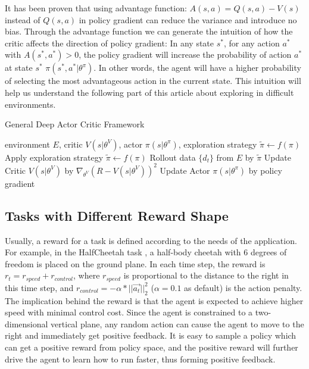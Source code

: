 It has been proven that using advantage function: $A(s,a)=Q(s,a)-V(s)$ instead of $Q(s,a)$ in policy gradient can reduce the variance and introduce no bias. Through the advantage function we can generate the intuition of how the critic affects the direction of policy gradient: In any state $s^*$, for any action $a^*$ with $A(s^*,a^*) > 0$, the policy gradient will increase the probability of action $a^*$ at state $s^*$ $\pi(s^*,a^*|\theta^{\pi})$. In other words, the agent will have a higher probability of selecting the most advantageous action in the current state. This intuition will help us understand the following part of this article about exploring in difficult environments.

\begin{algorithm}[htbp]
    \caption{General Deep Actor Critic Framework}
    \label{alg:gac}
 \begin{algorithmic}
     environment $E$, critic $V(s|\theta^V)$, actor $\pi(s|\theta^\pi)$, exploration strategy $\tilde\pi \leftarrow f(\pi)$
    \STATE Apply exploration strategy $\tilde\pi \leftarrow f(\pi)$
    \STATE Rollout data $\{d_t\}$ from $E$ by $\tilde\pi$
    \STATE Update Critic $V(s|\theta^V)$ by $\nabla_{\theta^V}(R-V(s|\theta^V))^2$
    \STATE Update Actor $\pi(s|\theta^\pi)$ by policy gradient 
    \ENDFOR
    \ENDFOR
 \end{algorithmic}
 \end{algorithm}



\subsection{Tasks with Different Reward Shape}
\label{sec:tasks}
Usually, a reward for a task is defined according to the needs of the application. For example, in the HalfCheetah task \cite{mujoco}, a half-body cheetah with 6 degrees of freedom is placed on the ground plane. In each time step, the reward is $r_t = r_{speed} + r_{control}$, where $r_{speed}$ is proportional to the distance to the right in this time step, and $r_{control} = -\alpha*||\vec{a_t}||^2_2$ ($\alpha = 0.1$ as default) is the action penalty. The implication behind the reward is that the agent is expected to achieve higher speed with minimal control cost. Since the agent is constrained to a two-dimensional vertical plane, any random action can cause the agent to move to the right and immediately get positive feedback. It is easy to sample a policy which can get a positive reward from policy space, and the positive reward will further drive the agent to learn how to run faster, thus forming positive feedback.

